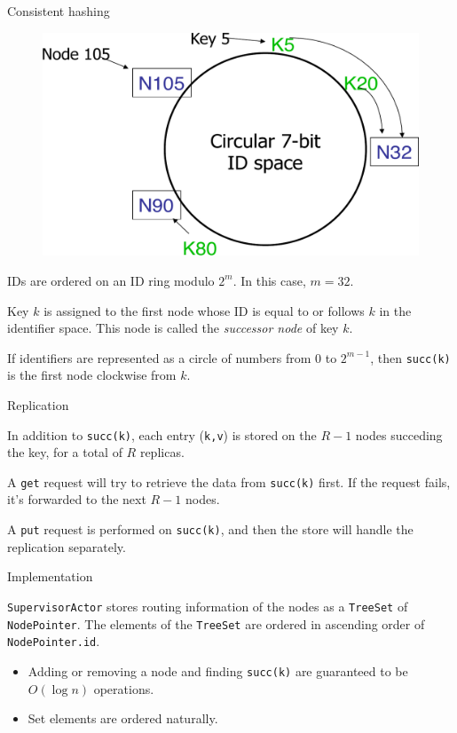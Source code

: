 \documentclass{beamer}
\begin{document}
\begin{frame}{Consistent hashing} \justify

    \begin{figure}
        \includegraphics[width=0.5\linewidth]{00-ConsistentHashing.png}
    \end{figure}
    
    IDs are ordered on an ID ring modulo $2^m$. In this case, $m=32$.
        
    Key $k$ is assigned to the first node whose ID is equal to or follows $k$ in the identifier space. This node is called the \textit{successor node} of key $k$. 
    
    If identifiers are represented as a circle of numbers from $0$ to $2^{m - 1}$, then \texttt{succ(k)} is the first node clockwise from $k$. 

\end{frame}

\begin{frame}{Replication} \justify

    In addition to \texttt{succ(k)}, each entry (\texttt{k,v}) is stored on the $R-1$ nodes succeding the key, for a total of $R$ replicas. 

    A \texttt{get} request will try to retrieve the data from \texttt{succ(k)} first. If the request fails, it's forwarded to the next $R-1$ nodes.

    A \texttt{put} request is performed on \texttt{succ(k)}, and then the store will handle the replication separately.

\end{frame}

\begin{frame}{Implementation} \justify
    
    \texttt{SupervisorActor} stores routing information of the nodes as a \texttt{TreeSet} of \texttt{NodePointer}. The elements of the \texttt{TreeSet} are ordered in ascending order of \texttt{NodePointer.id}.

    \begin{itemize}[label=$\bullet$]
        \item Adding or removing a node and finding \texttt{succ(k)} are guaranteed to be $O(\log n)$ operations.
        \item Set elements are ordered naturally.
    \end{itemize}

\end{frame}
\end{document}
